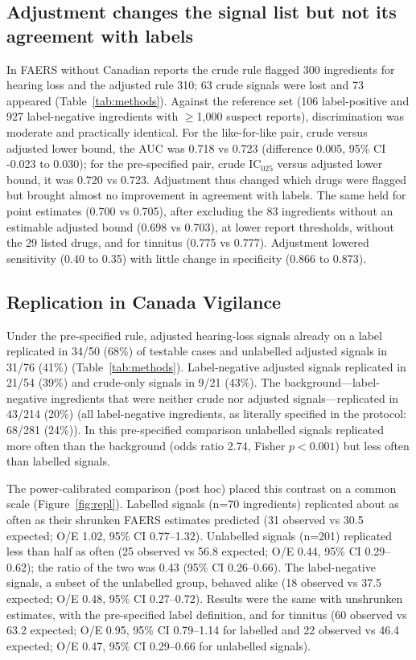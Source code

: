 \documentclass[11pt]{article}
\begin{document}
\subsection{Adjustment changes the signal list but not its agreement with labels}
In FAERS without Canadian reports the crude rule flagged 300 ingredients for hearing loss and the adjusted
rule 310; 63 crude signals were lost and 73 appeared
(Table~\ref{tab:methods}). Against the reference set (106 label-positive and 927 label-negative
ingredients with $\geq$1{,}000 suspect reports), discrimination was moderate and practically identical. For the
like-for-like pair, crude versus adjusted lower bound, the AUC was 0.718 vs
0.723 (difference 0.005, 95\% CI -0.023 to
0.030); for the pre-specified pair, crude IC$_{025}$ versus adjusted lower bound, it was
0.720 vs 0.723. Adjustment thus changed which drugs were flagged
but brought almost no improvement in agreement with labels. The same held for point estimates (0.700 vs
0.705), after excluding the 83 ingredients without an estimable
adjusted bound (0.698 vs
0.703), at lower report thresholds, without the 29 listed
drugs, and for tinnitus (0.775 vs 0.777). Adjustment lowered
sensitivity (0.40 to 0.35) with little change in specificity
(0.866 to 0.873).

\subsection{Replication in Canada Vigilance}
Under the pre-specified rule, adjusted hearing-loss signals already on a label replicated in 34/50 (68\%)
of testable cases and unlabelled adjusted signals in 31/76 (41\%) (Table~\ref{tab:methods}).
Label-negative adjusted signals replicated in 21/54 (39\%) and crude-only signals in
9/21 (43\%). The background---label-negative ingredients that were neither crude nor adjusted signals---replicated
in 43/214 (20\%) (all label-negative ingredients, as literally specified in the protocol:
68/281 (24\%)). In this pre-specified comparison unlabelled signals replicated more
often than the background (odds ratio 2.74, Fisher $p<0.001$) but less
often than labelled signals.

The power-calibrated comparison (post hoc) placed this contrast on a common scale (Figure~\ref{fig:repl}). Labelled signals
(n=70 ingredients) replicated about as often as their shrunken FAERS estimates predicted
(31 observed vs 30.5 expected; O/E 1.02, 95\% CI 0.77--1.32). Unlabelled signals (n=201) replicated less than half as often
(25 observed vs 56.8 expected; O/E 0.44, 95\% CI 0.29--0.62); the ratio of the two was 0.43
(95\% CI 0.26--0.66). The
label-negative signals, a subset of the unlabelled group, behaved alike (18 observed vs 37.5 expected; O/E 0.48, 95\% CI 0.27--0.72). Results were the
same with unshrunken estimates, with the pre-specified label definition, and for tinnitus (60 observed vs 63.2 expected; O/E 0.95, 95\% CI 0.79--1.14 for
labelled and 22 observed vs 46.4 expected; O/E 0.47, 95\% CI 0.29--0.66 for unlabelled signals).
\end{document}
